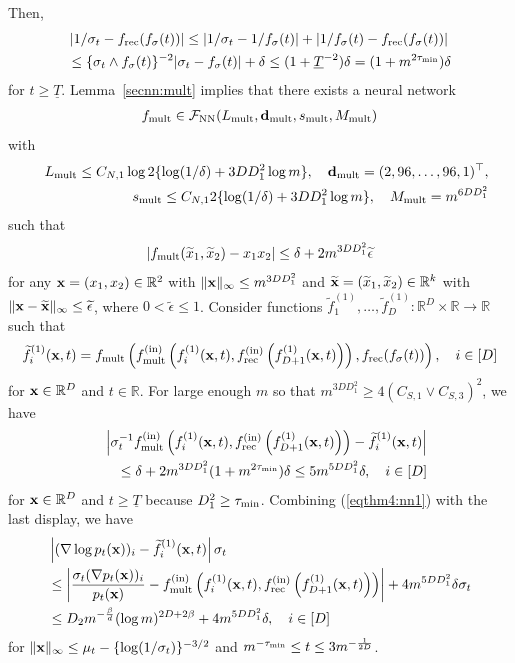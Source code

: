 \documentclass[twoside,11pt]{article}
\def\cF{\mathcal F}
\newcommand{\bd}{{\bf d}}
\newcommand{\bx}{{\bf x}}
\newcommand{\bbR}{{\mathbb R}}
\newcommand{\be}{\begin{equation}}
\newcommand{\ee}{\end{equation}}
\newcommand{\bean}{\setlength\arraycolsep{1pt}\begin{eqnarray*}}
\newcommand{\eean}{\end{eqnarray*}}
\begin{document}
Then,
\be \begin{split}
& \left\vert 1/\sigma_t - f_{\rm rec}(f_{\sigma}(t)) \right\vert \leq
\left\vert 1/\sigma_t - 1/ f_{\sigma}(t) \right\vert  + \left\vert  1/ f_{\sigma}(t) - f_{\rm rec}(f_{\sigma}(t)) \right\vert 
\\
& \leq \{ \sigma_t \wedge f_{\sigma}(t)\}^{-2} \vert \sigma_t - f_{\sigma}(t) \vert +  \delta \leq (1+ \underline{T}^{-2})  \delta  = (1 + m^{2\tau_{\rm min}}) \delta  \label{eqthm4:nnrecst}
\end{split} \ee
 for $t \geq  \underline{T}$. 
Lemma~\ref{secnn:mult} implies that there exists a neural network 
\bean
f_{\rm mult} \in \cF_{\rm NN}( L_{\rm mult},  \bd_{\rm mult}, s_{\rm mult},  M_{\rm mult})
\eean
with 
\bean
&&  L_{\rm mult} \leq C_{N,1} \log 2  \{\log(1/  \delta) + 3DD_{1}^2 \log m \}, \quad  \bd_{\rm mult} = (2,96,\ldots,96,1)^{\top},
\\
&& s_{\rm mult} \leq  C_{N,1} 2 \{\log(1/  \delta) 
+ 3DD_{1}^2 \log m \}, \quad   M_{\rm mult} =  m^{6DD_{1}^2 }
\eean
such that 
\be
\left\vert  f_{\rm mult}(\widetilde x_1, \widetilde x_2) - x_1 x_2\right\vert \leq  \delta + 2  m^{3DD_{1}^2} \widetilde \epsilon \label{eqthm4:nnmult}
\ee
for any $\bx = (x_1,x_2) \in \bbR^{2}$ with $ \|\bx\|_{\infty} \leq 
m^{3DD_{1}^2}$ and $\widetilde \bx = (\widetilde x_1,\widetilde x_{2}) \in \bbR^{k}$ with $\| \bx - \widetilde \bx\|_{\infty} \leq \widetilde \epsilon$,
where $0 < \widetilde \epsilon \leq 1 $.
Consider functions $\widetilde f_{1}^{(1)},\ldots,\widetilde f_{D}^{(1)} : \bbR^{D} \times \bbR \to \bbR$ such that
\bean
\widetilde f^{(1)}_{i}(\bx,t) =  f_{\rm mult} \left( f_{{\rm mult}}^{(\rm in)} \left( f_i^{(1)}(\bx,t) ,  f_{\rm rec}^{(\rm in)}\left(f_{D+1}^{(1)}(\bx,t) \right) \right) , f_{\rm rec} ( f_{\sigma}(t)) \right), \quad i \in [D]
\eean
for $\bx \in \bbR^{D}$ and $t \in \bbR$.
For large enough $m$ so that $m^{3DD_{1}^2} \geq  4(C_{S,1} \vee C_{S,3})^2$, we have
\bean
&& \left\vert \sigma_{t}^{-1} f_{{\rm mult}}^{(\rm in)} \left( f_i^{(1)}(\bx,t) ,  f_{\rm rec}^{(\rm in)}\left(f_{D+1}^{(1)}(\bx,t) \right) \right) - \widetilde f^{(1)}_{i}(\bx,t) \right\vert
\\
&& \leq \delta +  2  m^{3DD_{1}^2} (1+  m^{2\tau_{\rm min}}) \delta \leq 5 m^{5D D_{1}^2} \delta, \quad i \in [D]
\eean
for $\bx \in \bbR^{D}$ and $t \geq \underline{T}$ because $D_{1}^2 \geq \tau_{\rm min}$.
Combining (\ref{eqthm4:nn1}) with the last display, we have
\be \begin{split}
& \left\vert (\nabla \log p_t(\bx))_{i} - \widetilde f_{i}^{(1)}(\bx,t)  \right\vert \sigma_{t}
\\
& \leq \left\vert \frac{\sigma_t (\nabla p_t(\bx))_{i}}{p_t(\bx)} - f_{{\rm mult}}^{(\rm in)} \left( f_i^{(1)}(\bx,t) ,  f_{\rm rec}^{(\rm in)}\left(f_{D+1}^{(1)}(\bx,t) \right) \right)  \right\vert + 4 m^{5DD_{1}^2} \delta \sigma_{t}
\\
& \leq D_{2} m^{-\frac{\beta}{d}} (\log m)^{2D+2\beta } +  4 m^{5DD_{1}^2} \delta, \quad i \in [D] \label{eqthm4:nn1err}
\end{split} \ee
for $\|\bx\|_{\infty} \leq \mu_t- \{ \log (1/\sigma_t)\}^{-3/2}$ and $m^{-\tau_{\rm min}} \leq t \leq  3 m^{-\frac{1}{2D}}$.
\end{document}
